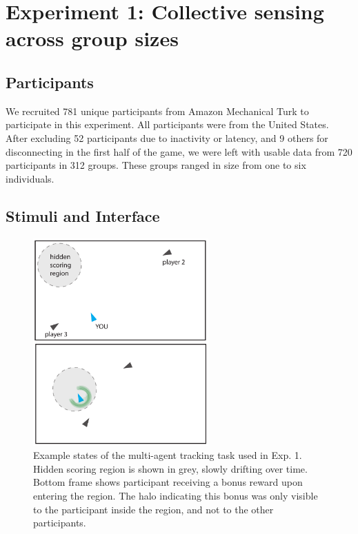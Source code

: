 \documentclass[12pt,letterpaper]{article}
\begin{document}




\section{Experiment 1: Collective sensing across group sizes}

\subsection{Participants}
We recruited 781 unique participants from Amazon Mechanical Turk to participate in this experiment.  All participants were from the United States.  After excluding 52 participants due to inactivity or latency, and 9 others for disconnecting in the first half of the game, we were left with usable data from 720 participants in 312 groups.  These groups ranged in size from one to six individuals. 

\subsection{Stimuli and Interface}

\begin{figure}[t!]
  \centering
  \includegraphics[width=0.6\textwidth]{./figures/experiment1_design.pdf}
  \hspace{0.1cm}
  \caption{Example states of the multi-agent tracking task used in Exp. 1. Hidden scoring region is shown in grey, slowly drifting over time. Bottom frame shows participant receiving a bonus reward upon entering the region. The halo indicating this bonus was only visible to the participant inside the region, and not to the other participants.}
  \label{fig:score}
\end{figure}
\end{document}
